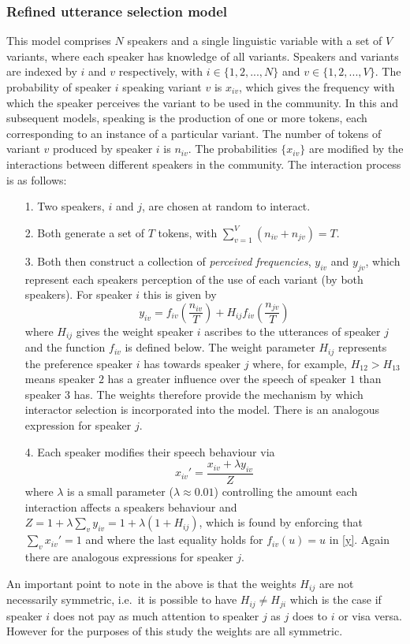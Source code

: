\documentclass[12pt]{article}
\begin{document}
\subsubsection{Refined utterance selection model}
This model comprises $N$ speakers and a single linguistic variable with a set of $V$ variants, where each speaker has knowledge of all variants. Speakers and variants are indexed by $i$ and $v$ respectively, with $i \in \{1, 2, ... , N\}$ and $v \in \{1, 2, ..., V\}$. The probability of speaker $i$ speaking variant $v$ is $x_{iv}$, which gives the frequency with which the speaker perceives the variant to be used in the community. In this and subsequent models, speaking is the production of one or more tokens, each corresponding to an instance of a particular variant. The number of tokens of variant $v$ produced by speaker $i$ is $n_{iv}$. The probabilities $\{x_{iv}\}$ are modified by the interactions between different speakers in the community. The interaction process is as follows: 
\begin{itemize}
\item[1.] Two speakers, $i$ and $j$, are chosen at random to interact.
\item[2.] Both generate a set of $T$ tokens, with $\sum\limits_{v = 1}^{V} (n_{iv} + n_{jv}) = T$. 
\item[3.] Both then construct a collection of \emph{perceived frequencies}, $y_{iv}$ and $y_{jv}$, which represent each speakers perception of the use of each variant (by both speakers). For speaker $i$ this is given by
\begin{equation} \label{y}
y_{iv} = f_{iv}\left(\frac{n_{iv}}{T}\right) + H_{ij}f_{iv}\left(\frac{n_{jv}}{T}\right)
\end{equation}
where $H_{ij}$ gives the weight speaker $i$ ascribes to the utterances of speaker $j$ and the function $f_{iv}$ is defined below. The weight parameter $H_{ij}$ represents the preference speaker $i$ has towards speaker $j$ where, for example, $H_{12}>H_{13}$ means speaker $2$ has a greater influence over the speech of speaker $1$ than speaker $3$ has. The weights therefore provide the mechanism by which interactor selection is incorporated into the model. There is an analogous expression for speaker $j$. 
\item[4.] Each speaker modifies their speech behaviour via
\begin{equation}\label{x}
x_{iv}' = \frac{x_{iv} + \lambda y_{iv}}{Z}
\end{equation}
where $\lambda$ is a small parameter ($\lambda \approx 0.01$) controlling the amount each interaction affects a speakers behaviour and $Z = 1 + \lambda \sum\limits_{v} y_{iv} = 1 + \lambda (1 + H_{ij})$, which is found by enforcing that $\sum\limits_{v} x_{iv}' = 1$ and where the last equality holds for $f_{iv}(u) = u$ in \eqref{y}. Again there are analogous expressions for speaker $j$.
\end{itemize}
An important point to note in the above is that the weights $H_{ij}$ are not necessarily symmetric, i.e.\ it is possible to have $H_{ij} \neq  H_{ji}$ which is the case if speaker $i$ does not pay as much attention to speaker $j$ as $j$ does to $i$ or visa versa. However for the purposes of this study the weights are all symmetric. 
\end{document}

